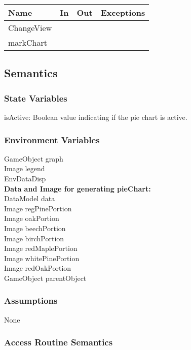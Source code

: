 \documentclass[12pt, titlepage]{article}
\begin{document}
\begin{center}
\begin{tabular}{| l | l | l | p{5cm}|}
\hline
\textbf{Name} & \textbf{In} & \textbf{Out} & \textbf{Exceptions} \\
\hline
 ChangeView&  &  &  \\
\hline
 markChart&  & & \\
\hline
\end{tabular}
\end{center}

\subsection{Semantics}

\subsubsection{State Variables}

isActive: Boolean value indicating if the pie chart is active. 

\subsubsection{Environment Variables}

GameObject graph\\
Image legend\\
EnvDataDisp\\

\noindent\textbf{Data and Image for generating pieChart:}\\
DataModel data\\
Image regPinePortion\\
Image oakPortion\\
Image beechPortion\\
Image birchPortion\\
Image redMaplePortion\\
Image whitePinePortion\\
Image redOakPortion\\

\noindent GameObject parentObject\\

\subsubsection{Assumptions}
None
\subsubsection{Access Routine Semantics}
\end{document}
